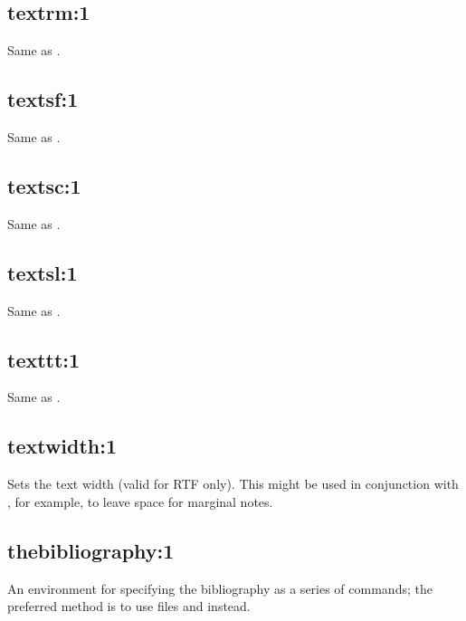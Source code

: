 \subsection*{textrm:1}\label{textrm}

Same as .

\subsection*{textsf:1}\label{textsf}

Same as .

\subsection*{textsc:1}\label{textsc}

Same as .

\subsection*{textsl:1}\label{textsl}

Same as .

\subsection*{texttt:1}\label{texttt}

Same as .


\subsection*{textwidth:1}\label{textwidth}

Sets the text width (valid for RTF only). This might be used
in conjunction with , for example,
to leave space for marginal notes.

\subsection*{thebibliography:1}\label{thebibliography}

An environment for specifying the bibliography as a series of\rtfsp
{} commands; the preferred method is to use
 files and  instead.

